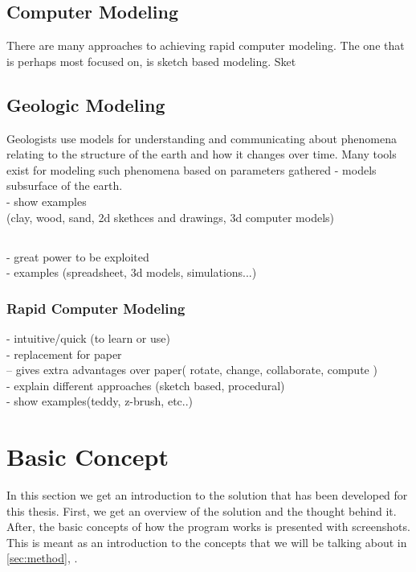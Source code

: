 \documentclass[a4paper,12pt]{report}
\newcommand{\secref}[1]{\autoref{#1}, \nameref{#1}}
\begin{document}
\section{Computer Modeling}
There are many approaches to achieving rapid computer modeling. The one that is perhaps most focused on, is sketch based modeling. Sket

\section{Geologic Modeling}
Geologists use models for understanding and communicating about phenomena relating to the structure of the earth and how it changes over time. Many tools exist for modeling such phenomena based on parameters gathered 
- models subsurface of the earth.\\
- show examples\\(clay, wood, sand, 2d skethces and drawings, 3d computer models)

\section{}
- great power to be exploited\\
- examples (spreadsheet, 3d models, simulations...)\\
\subsection{Rapid Computer Modeling}
- intuitive/quick (to learn or use)\\
- replacement for paper\\
  -- gives extra advantages over paper( rotate, change, collaborate, compute )\\
- explain different approaches (sketch based, procedural)\\
- show examples(teddy, z-brush, etc..)\\

\clearpage
\chapter{Basic Concept}
In this section we get an introduction to the solution that has been developed for this thesis. First, we get an overview of the solution and the thought behind it. After, the basic concepts of how the program works is presented with screenshots.  This is meant as an introduction to the concepts that we will be talking about in \secref{sec:method}.
\label{sec:concept}
\end{document}
